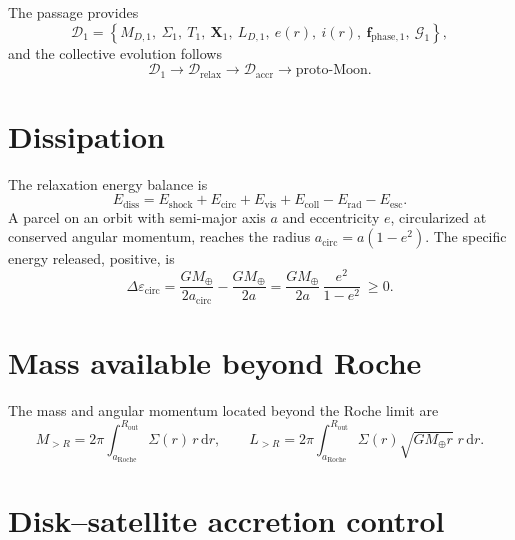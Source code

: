 \documentclass[11pt,a4paper,openany]{report}
\newcommand{\Mt}{M_{\oplus}}
\newcommand{\aR}{a_{\mathrm{Roche}}}
\newcommand{\dd}{\mathrm{d}}
\begin{document}
The passage provides
\begin{equation}
\mathcal{D}_1=\left\{M_{D,1},\ \Sigma_1,\ T_1,\ \mathbf{X}_1,\ L_{D,1},\ e(r),\ i(r),\
\mathbf{f}_{\mathrm{phase},1},\ \mathcal{G}_1\right\},
\label{eq:D1}
\end{equation}
and the collective evolution follows
\begin{equation}
\mathcal{D}_1\longrightarrow\mathcal{D}_{\mathrm{relax}}\longrightarrow\mathcal{D}_{\mathrm{accr}}
\longrightarrow\text{proto-Moon}.
\label{eq:evolution}
\end{equation}

\section{Dissipation}

The relaxation energy balance is
\begin{equation}
E_{\mathrm{diss}}=E_{\mathrm{shock}}+E_{\mathrm{circ}}+E_{\mathrm{vis}}+E_{\mathrm{coll}}
-E_{\mathrm{rad}}-E_{\mathrm{esc}}.
\label{eq:Ediss}
\end{equation}
A parcel on an orbit with semi-major axis $a$ and eccentricity $e$, circularized at conserved
angular momentum, reaches the radius $a_{\mathrm{circ}}=a(1-e^2)$. The specific energy released,
positive, is
\begin{equation}
\Delta\varepsilon_{\mathrm{circ}}=\frac{G\Mt}{2a_{\mathrm{circ}}}-\frac{G\Mt}{2a}
=\frac{G\Mt}{2a}\,\frac{e^2}{1-e^2}\ \ge0.
\label{eq:circ}
\end{equation}

\section{Mass available beyond Roche}

The mass and angular momentum located beyond the Roche limit are
\begin{equation}
M_{>R}=2\pi\int_{\aR}^{R_{\mathrm{out}}}\Sigma(r)\,r\,\dd r,
\qquad
L_{>R}=2\pi\int_{\aR}^{R_{\mathrm{out}}}\Sigma(r)\sqrt{G\Mt r}\;r\,\dd r.
\label{eq:MR}
\end{equation}

\section{Disk--satellite accretion control}
\end{document}
